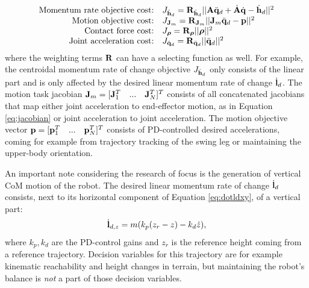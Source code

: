 \begin{equation*}
\begin{array}{rlcl}
$Momentum rate objective cost:$ & J_{\dot{\vect{h}}_d}= \wght_{\dot{\vect{h}}_d}||\matr{A}\ddqjntd + \dot{\matr{A}}\dqjnt - \dot{\vect{h}}_d||^2\\
$Motion objective cost:$ & J_{\matr{J}_m} = \wght_{\matr{J}_m}||\matr{J}_m\ddqjntd-\vect{p}||^2\\
$Contact force cost:$ & J_{\bs{\rho}}=\wght_{\bs{\rho}}||\bs{\rho}||^2 \\
$Joint acceleration cost:$ & J_{\ddqjntd} = \wght_{\ddqjntd}||\ddqjntd ||^2 \\
\end{array}
\end{equation*}
where the weighting terms $\mathbf{R}$ can have a selecting function as well. For example, the centroidal momentum rate of change objective $J_{\dot{\mathbf{h}}_d}$ only consists of the linear part and is only affected by the desired linear momentum rate of change $\dot{\mathbf{l}}_d$. The motion task jacobian $\mathbf{J}_m = [\mathbf{J}_1^T\quad...\quad\mathbf{J}_N^T]^T$ consists of all concatenated jacobians that map either joint acceleration to end-effector motion, as in Equation \eqref{eq:jacobian} or joint acceleration to joint acceleration. The motion objective vector $\mathbf{p} = [\mathbf{p}_1^T\quad...\quad\mathbf{p}_N^T]^T$  consists of PD-controlled desired accelerations, coming for example from trajectory tracking of the swing leg or maintaining the upper-body orientation. %

An important note considering the research of focus is the generation of vertical \ac{CoM} motion of the robot. The desired linear momentum rate of change $\dot{\mathbf{l}}_d$ consists, next to its horizontal component of Equation \eqref{eq:dotldxy}, of a vertical part:
\begin{equation}
\dot{\mathbf{l}}_{d,z} =m(k_p(z_r-z) - k_d\dot{z}), 
\label{eq:defaultheightcontrol}
\end{equation}
where $k_p, k_d$ are the PD-control gains and $z_r$ is the reference height coming from a reference trajectory. Decision variables for this trajectory are for example kinematic reachability and height changes in terrain, but maintaining the robot's balance is \textit{not} a part of those decision variables.


